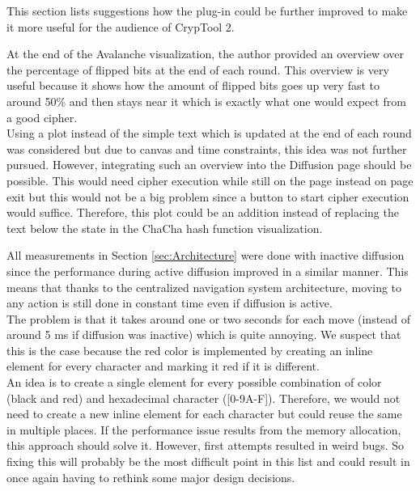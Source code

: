 This section lists suggestions how the plug-in could be further improved to make it more useful for the audience of CrypTool 2.

\begin{description}[style=nextline]

\item[Better overview over flipped bits at the end of each round]

At the end of the Avalanche visualization, the author provided an overview over the percentage of flipped bits at the end of each round. This overview is very useful because it shows how the amount of flipped bits goes up very fast to around 50\% and then stays near it which is exactly what one would expect from a good cipher. \\
Using a plot instead of the simple text which is updated at the end of each round was considered but due to canvas and time constraints, this idea was not further pursued. However, integrating such an overview into the Diffusion page should be possible. This would need cipher execution while still on the page instead on page exit but this would not be a big problem since a button to start cipher execution would suffice. Therefore, this plot could be an addition instead of replacing the text below the state in the ChaCha hash function visualization.

\item[Improve performance during diffusion]

All measurements in Section \ref{sec:Architecture} were done with inactive diffusion since the performance during active diffusion improved in a similar manner. This means that thanks to the centralized navigation system architecture, moving to any action is still done in constant time even if diffusion is active. \\
The problem is that it takes around one or two seconds for each move (instead of around 5 ms if diffusion was inactive) which is quite annoying. We suspect that this is the case because the red color is implemented by creating an inline element for every character and marking it red if it is different. \\
An idea is to create a single element for every possible combination of color (black and red) and hexadecimal character ([0-9A-F]). Therefore, we would not need to create a new inline element for each character but could reuse the same in multiple places. If the performance issue results from the memory allocation, this approach should solve it. However, first attempts resulted in weird bugs. So fixing this will probably be the most difficult point in this list and could result in once again having to rethink some major design decisions.


\end{description}
